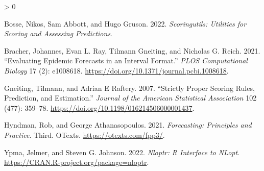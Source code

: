 \documentclass[
]{article}
\newlength{\cslhangindent}
\newenvironment{CSLReferences}[2] %
 {%
  \setlength{\parindent}{0pt}
  \ifodd #1 \everypar{\setlength{\hangindent}{\cslhangindent}}\ignorespaces\fi
  \ifnum #2 > 0
  \setlength{\parskip}{#2\baselineskip}
  \fi
 }%
 {}
\begin{document}
\hypertarget{refs}{}
\begin{CSLReferences}{1}{0}
\leavevmode\hypertarget{ref-R-scoringutils}{}%
Bosse, Nikos, Sam Abbott, and Hugo Gruson. 2022. \emph{Scoringutils: Utilities for Scoring and Assessing Predictions}.

\leavevmode\hypertarget{ref-bracher2021}{}%
Bracher, Johannes, Evan L. Ray, Tilmann Gneiting, and Nicholas G. Reich. 2021. {``Evaluating Epidemic Forecasts in an Interval Format.''} \emph{PLOS Computational Biology} 17 (2): e1008618. \url{https://doi.org/10.1371/journal.pcbi.1008618}.

\leavevmode\hypertarget{ref-gneiting2007}{}%
Gneiting, Tilmann, and Adrian E Raftery. 2007. {``Strictly {Proper Scoring Rules}, {Prediction}, and {Estimation}.''} \emph{Journal of the American Statistical Association} 102 (477): 359--78. \url{https://doi.org/10.1198/016214506000001437}.

\leavevmode\hypertarget{ref-hyndman2021}{}%
Hyndman, Rob, and George Athanasopoulos. 2021. \emph{Forecasting: Principles and Practice}. Third. {OTexts}. \url{https://otexts.com/fpp3/}.

\leavevmode\hypertarget{ref-R-nloptr}{}%
Ypma, Jelmer, and Steven G. Johnson. 2022. \emph{Nloptr: R Interface to NLopt}. \url{https://CRAN.R-project.org/package=nloptr}.

\end{CSLReferences}
\end{document}
